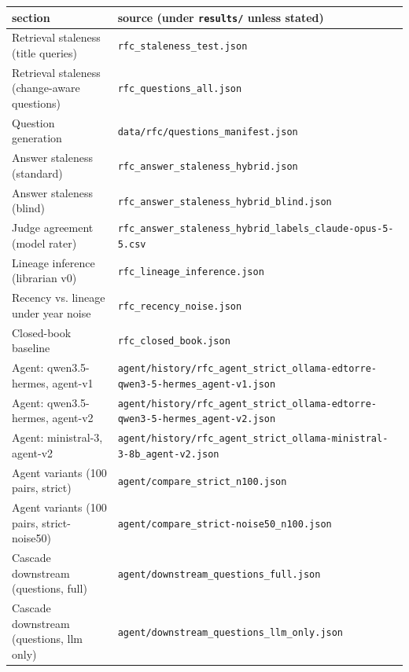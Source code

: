 \begin{tabular}{ll}
\toprule
section & source (under \texttt{results/} unless stated) \\
\midrule
Retrieval staleness (title queries) & \texttt{rfc\_staleness\_test.json} \\
Retrieval staleness (change-aware questions) & \texttt{rfc\_questions\_all.json} \\
Question generation & \texttt{data/rfc/questions\_manifest.json} \\
Answer staleness (standard) & \texttt{rfc\_answer\_staleness\_hybrid.json} \\
Answer staleness (blind) & \texttt{rfc\_answer\_staleness\_hybrid\_blind.json} \\
Judge agreement (model rater) & \texttt{rfc\_answer\_staleness\_hybrid\_labels\_claude-opus-5-5.csv} \\
Lineage inference (librarian v0) & \texttt{rfc\_lineage\_inference.json} \\
Recency vs. lineage under year noise & \texttt{rfc\_recency\_noise.json} \\
Closed-book baseline & \texttt{rfc\_closed\_book.json} \\
Agent: qwen3.5-hermes, agent-v1 & \texttt{agent/history/rfc\_agent\_strict\_ollama-edtorre-qwen3-5-hermes\_agent-v1.json} \\
Agent: qwen3.5-hermes, agent-v2 & \texttt{agent/history/rfc\_agent\_strict\_ollama-edtorre-qwen3-5-hermes\_agent-v2.json} \\
Agent: ministral-3, agent-v2 & \texttt{agent/history/rfc\_agent\_strict\_ollama-ministral-3-8b\_agent-v2.json} \\
Agent variants (100 pairs, strict) & \texttt{agent/compare\_strict\_n100.json} \\
Agent variants (100 pairs, strict-noise50) & \texttt{agent/compare\_strict-noise50\_n100.json} \\
Cascade downstream (questions, full) & \texttt{agent/downstream\_questions\_full.json} \\
Cascade downstream (questions, llm only) & \texttt{agent/downstream\_questions\_llm\_only.json} \\
\bottomrule
\end{tabular}
